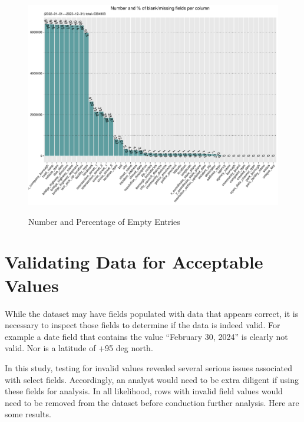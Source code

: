 \documentclass[12pt, titlepage]{article}
\begin{document}
\begin{figure}[tbp]
  \centering
  	\caption{Number and Percentage of Empty Entries}
	\includegraphics[width=\textwidth]{BlankFields.pdf}
	\label{fig:blank_fields}
\end{figure}



 \section{Validating Data for Acceptable Values}\label{sec:domain}
 While the dataset may have fields populated with data that appears correct, it is necessary to inspect those fields to determine if the data is indeed valid. 
 For example a date field that contains the value ``February 30, 2024'' is clearly not valid. Nor is a latitude of +95 deg north. 
 
 In this study, testing for invalid values revealed several serious issues associated with select fields. Accordingly, an analyst would need to be
extra diligent if using these fields for analysis. In all likelihood, rows with invalid field values would  need to be removed from the
dataset before conduction further analysis. Here are some results.
\end{document}
